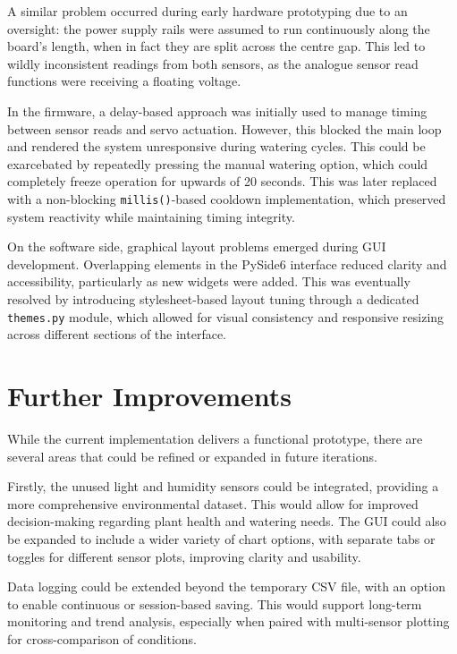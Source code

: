 \documentclass[a4paper,11pt]{article}
\begin{document}
A similar problem occurred during early hardware prototyping due to an oversight: 
the power supply rails were assumed to run continuously along the board's length, 
when in fact they are split across the centre gap. 
This led to wildly inconsistent readings from both sensors,
as the analogue sensor read functions were receiving a floating voltage.

In the firmware, a delay-based approach was initially used 
to manage timing between sensor reads and servo actuation. 
However, this blocked the main loop and rendered the system unresponsive 
during watering cycles. 
This could be exarcebated by repeatedly pressing the manual watering option,
which could completely freeze operation for upwards of 20 seconds.
This was later replaced with a non-blocking \texttt{millis()}-based cooldown implementation, 
which preserved system reactivity while maintaining timing integrity.

On the software side, graphical layout problems emerged during GUI development. 
Overlapping elements in the PySide6 interface reduced clarity and accessibility, 
particularly as new widgets were added. 
This was eventually resolved by introducing stylesheet-based layout tuning 
through a dedicated \texttt{themes.py} module, 
which allowed for visual consistency and 
responsive resizing across different sections of the interface.

\section{Further Improvements}
\label{sec:further_improvements}

While the current implementation delivers a functional prototype, 
there are several areas that could be refined or expanded in future iterations.

Firstly, the unused light and humidity sensors could be integrated, 
providing a more comprehensive environmental dataset. 
This would allow for improved decision-making regarding plant health and watering needs. 
The GUI could also be expanded to include a wider variety of chart options, 
with separate tabs or toggles for different sensor plots, improving clarity and usability.

Data logging could be extended beyond the temporary CSV file, 
with an option to enable continuous or session-based saving. 
This would support long-term monitoring and trend analysis, 
especially when paired with multi-sensor plotting for cross-comparison of conditions.
\end{document}
